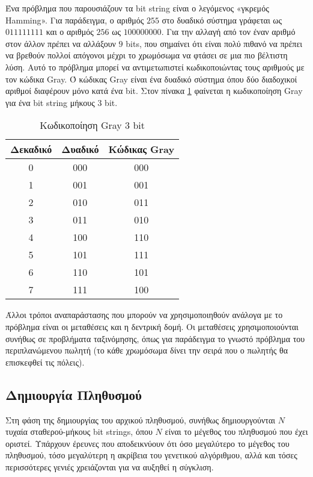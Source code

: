 Ένα πρόβλημα που παρουσιάζουν τα bit string είναι ο λεγόμενος «γκρεμός Hamming». Για παράδειγμα, ο αριθμός $255$ στο δυαδικό σύστημα γράφεται ως $011111111$ και ο αριθμός $256$ ως $100000000$. Για την αλλαγή από τον έναν αριθμό στον άλλον πρέπει να αλλάξουν $9$ bits, που σημαίνει ότι είναι πολύ πιθανό να πρέπει να βρεθούν πολλοί απόγονοι μέχρι το χρωμόσωμα να φτάσει σε μια πιο βέλτιστη λύση. Αυτό το πρόβλημα μπορεί να αντιμετωπιστεί κωδικοποιώντας τους αριθμούς με τον κώδικα Gray. Ό κώδικας Gray είναι ένα δυαδικό σύστημα όπου δύο διαδοχικοί αριθμοί διαφέρουν μόνο κατά ένα bit. \cite{Lehre} Στον πίνακα \ref{table_gray_code} φαίνεται η κωδικοποίηση Gray για ένα bit string μήκους 3 bit.

\begin{table}[!t]
    \renewcommand{\arraystretch}{1.3}
    \caption{Κωδικοποίηση Gray 3 bit}
    \label{table_gray_code}
    \centering
    \begin{tabular}{c|c|c}
        \hline
        \bfseries Δεκαδικό & \bfseries Δυαδικό & \bfseries Κώδικας Gray\\
        \hline\hline
        0 & 000 & 000\\
        1 & 001 & 001\\
        2 & 010 & 011\\
        3 & 011 & 010\\
        4 & 100 & 110\\
        5 & 101 & 111\\
        6 & 110 & 101\\
        7 & 111 & 100\\
        \hline
    \end{tabular}
\end{table}

Άλλοι τρόποι αναπαράστασης που μπορούν να χρησιμοποιηθούν ανάλογα με το πρόβλημα είναι οι μεταθέσεις και η δεντρική δομή. Οι μεταθέσεις χρησιμοποιούνται συνήθως σε προβλήματα ταξινόμησης, όπως για παράδειγμα το γνωστό πρόβλημα του περιπλανώμενου πωλητή (το κάθε χρωμόσωμα δίνει την σειρά που ο πωλητής θα επισκεφθεί τις πόλεις). \cite{Obitko}

\subsection{Δημιουργία Πληθυσμού}

Στη φάση της δημιουργίας του αρχικού πληθυσμού, συνήθως δημιουργούνται $Ν$ τυχαία σταθερού-μήκους bit strings, όπου $Ν$ είναι το μέγεθος του πληθυσμού που έχει οριστεί. Υπάρχουν έρευνες που αποδεικνύουν ότι όσο μεγαλύτερο το μέγεθος του πληθυσμού, τόσο μεγαλύτερη η ακρίβεια του γενετικού αλγόριθμου, αλλά και τόσες περισσότερες γενιές χρειάζονται για να αυξηθεί η σύγκλιση. \cite{Gotshall2008}

